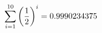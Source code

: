 \documentclass[preview]{standalone}
\begin{document}
\begin{align*}
\sum_{i=1}^{ 10 } \left({ 1 } \over {2} \right)^i = { 0.9990234375 }
\end{align*}
\end{document}
